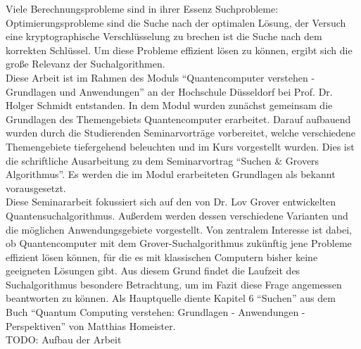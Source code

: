 Viele Berechnungsprobleme sind in ihrer Essenz Suchprobleme: Optimierungsprobleme sind die Suche nach der optimalen Lösung, der Versuch eine kryptographische Verschlüsselung zu brechen ist die Suche nach dem korrekten Schlüssel. Um diese Probleme effizient lösen zu können, ergibt sich die große Relevanz der Suchalgorithmen.
\\
Diese Arbeit ist im Rahmen des Moduls “Quantencomputer verstehen - Grundlagen und Anwendungen” an der Hochschule Düsseldorf bei Prof. Dr. Holger Schmidt entstanden. In dem Modul wurden zunächst gemeinsam die Grundlagen des Themengebiets Quantencomputer erarbeitet. Darauf aufbauend wurden durch die Studierenden Seminarvorträge vorbereitet, welche verschiedene Themengebiete tiefergehend beleuchten und im Kurs vorgestellt wurden. Dies ist die schriftliche Ausarbeitung zu dem Seminarvortrag “Suchen \& Grovers Algorithmus”. Es werden die im Modul erarbeiteten Grundlagen als bekannt vorausgesetzt.
\newline
\\
Diese Seminararbeit fokussiert sich auf den von Dr. Lov Grover entwickelten Quantensuchalgorithmus. Außerdem werden dessen verschiedene Varianten und die möglichen Anwendungsgebiete vorgestellt.
Von zentralem Interesse ist dabei, ob Quantencomputer mit dem Grover-Suchalgorithmus zukünftig jene Probleme effizient lösen können, für die es mit klassischen Computern bisher keine geeigneten Lösungen gibt. 
Aus diesem Grund findet die Laufzeit des Suchalgorithmus besondere Betrachtung, um im Fazit diese Frage angemessen beantworten zu können. 
Als Hauptquelle diente Kapitel 6 “Suchen” aus dem Buch “Quantum Computing verstehen: Grundlagen - Anwendungen - Perspektiven” von Matthias Homeister.
\newline
\\
TODO: Aufbau der Arbeit